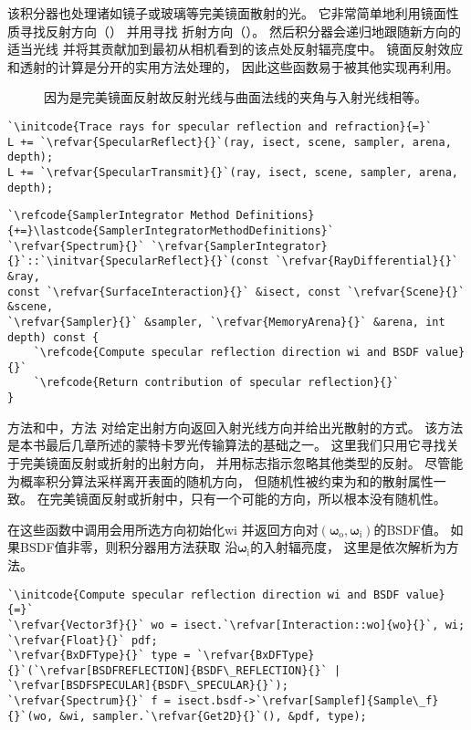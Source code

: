该积分器也处理诸如镜子或玻璃等完美镜面散射的光。
它非常简单地利用镜面性质寻找反射方向（）
并用寻找
折射方向（）。
然后积分器会递归地跟随新方向的适当光线
并将其贡献加到最初从相机看到的该点处反射辐亮度中。
镜面反射效应和透射的计算是分开的实用方法处理的，
因此这些函数易于被其他实现再利用。
\begin{figure}[htbp]
    \centering
    \caption{因为是完美镜面反射故反射光线与曲面法线的夹角与入射光线相等。}
    \label{fig:1.21}
\end{figure}
\begin{lstlisting}
`\initcode{Trace rays for specular reflection and refraction}{=}`
L += `\refvar{SpecularReflect}{}`(ray, isect, scene, sampler, arena, depth);
L += `\refvar{SpecularTransmit}{}`(ray, isect, scene, sampler, arena, depth);
\end{lstlisting}
\begin{lstlisting}
`\refcode{SamplerIntegrator Method Definitions}{+=}\lastcode{SamplerIntegratorMethodDefinitions}`
`\refvar{Spectrum}{}` `\refvar{SamplerIntegrator}{}`::`\initvar{SpecularReflect}{}`(const `\refvar{RayDifferential}{}` &ray,
const `\refvar{SurfaceInteraction}{}` &isect, const `\refvar{Scene}{}` &scene,
`\refvar{Sampler}{}` &sampler, `\refvar{MemoryArena}{}` &arena, int depth) const {
    `\refcode{Compute specular reflection direction wi and BSDF value}{}`
    `\refcode{Return contribution of specular reflection}{}`
}
\end{lstlisting}

方法和中，方法
对给定出射方向返回入射光线方向并给出光散射的方式。
该方法是本书最后几章所述的蒙特卡罗光传输算法的基础之一。
这里我们只用它寻找关于完美镜面反射或折射的出射方向，
并用标志指示忽略其他类型的反射。
尽管能
为概率积分算法采样离开表面的随机方向，
但随机性被约束为和的散射属性一致。
在完美镜面反射或折射中，只有一个可能的方向，所以根本没有随机性。

在这些函数中调用会用所选方向初始化{\ttfamily wi}
并返回方向对$({\bm \omega}_\mathrm{o},{\bm \omega}_\mathrm{i})$的BSDF值。
如果BSDF值非零，则积分器用方法获取
沿${\bm \omega}_\mathrm{i}$的入射辐亮度，
这里是依次解析为方法。
\begin{lstlisting}
`\initcode{Compute specular reflection direction wi and BSDF value}{=}`
`\refvar{Vector3f}{}` wo = isect.`\refvar[Interaction::wo]{wo}{}`, wi;
`\refvar{Float}{}` pdf;
`\refvar{BxDFType}{}` type = `\refvar{BxDFType}{}`(`\refvar[BSDFREFLECTION]{BSDF\_REFLECTION}{}` | `\refvar[BSDFSPECULAR]{BSDF\_SPECULAR}{}`);
`\refvar{Spectrum}{}` f = isect.bsdf->`\refvar[Samplef]{Sample\_f}{}`(wo, &wi, sampler.`\refvar{Get2D}{}`(), &pdf, type);
\end{lstlisting}

